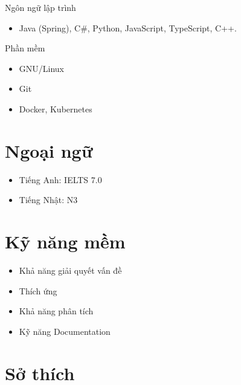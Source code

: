 \documentclass{res}
\newcommand{\inFrench}[1]{}
\newcommand{\inEnglish}[1]{#1}
\begin{document}
\begin{resume}
\inEnglish{
	Ngôn ngữ lập trình
	\vspace{0.05in}
	\begin{itemize}
		\item Java (Spring), C\#, Python, JavaScript, TypeScript, C++.
	\end{itemize}

	Phần mềm
	\vspace{0.05in}
	\begin{itemize}\itemsep -2pt
		\item GNU/Linux
		\item Git
		\item Docker, Kubernetes
	\end{itemize}
}




\inEnglish{
	\section{Ngoại ngữ}
}
\vspace{6pt}

\inEnglish{
	\vspace{6pt}
	\begin{itemize} \itemsep -2pt
		\item Tiếng Anh: IELTS 7.0
		\item Tiếng Nhật: N3
	\end{itemize}
}

\inEnglish{
	\section{Kỹ năng mềm}
	\vspace{6pt}
	\vspace{6pt}
	\begin{itemize} \itemsep -2pt
		\item Khả năng giải quyết vấn đề
		\item Thích ứng 
		\item Khả năng phân tích
		\item Kỹ năng Documentation
	\end{itemize}
}

\inFrench{
	\section{Intérêts personnels}
}
\inEnglish{
	\section{Sở thích}
}
\vspace{6pt}



\end{resume}
\end{document}
